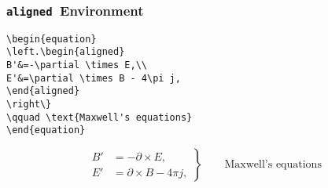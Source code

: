\subsubsection{\texttt{\Large aligned}~Environment}
%
\begin{verbatim}
\begin{equation}
\left.\begin{aligned}
B'&=-\partial \times E,\\
E'&=\partial \times B - 4\pi j,
\end{aligned}
\right\}
\qquad \text{Maxwell's equations}
\end{equation}
\end{verbatim}
%
%
\begin{equation}
	\left.\begin{aligned}
		B'&=-\partial \times E,\\
		E'&=\partial \times B - 4\pi j,
	\end{aligned}
	\right\}
	\qquad \text{Maxwell's equations}
\end{equation}
%
%
